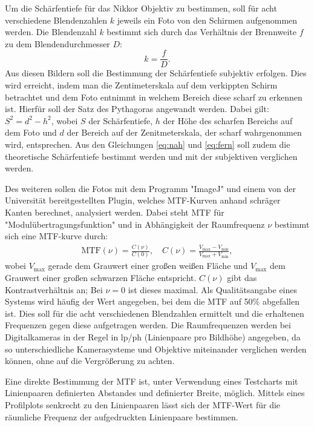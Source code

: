		Um die Schärfentiefe für das Nikkor Objektiv zu bestimmen, soll für acht verschiedene Blendenzahlen $k$ jeweils ein Foto von den Schirmen aufgenommen werden.
		Die Blendenzahl $k$ bestimmt sich durch das Verhältnis der Brennweite $f$ zu dem Blendendurchmesser $D$: 
		\begin{equation}
			k = \frac{f}{D}.
		\end{equation}
		Aus diesen Bildern soll die Bestimmung der Schärfentiefe subjektiv erfolgen.
		Dies wird erreicht, indem man die Zentimeterskala auf dem verkippten Schirm betrachtet und dem Foto entnimmt in welchem Bereich diese scharf zu erkennen ist.
		Hierfür soll der Satz des Pythagoras angewandt werden.
		Dabei gilt: $S^2 = d^2 - h^2$, wobei $S$ der Schärfentiefe, $h$ der Höhe des scharfen Bereichs auf dem Foto und $d$ der Bereich auf der Zenitmeterskala, der scharf wahrgenommen wird, entsprechen.
		Aus den Gleichungen \ref{eq:nah} und \ref{eq:fern} soll zudem die theoretische Schärfentiefe bestimmt werden und mit der subjektiven verglichen werden.
		
		Des weiteren sollen die Fotos mit dem Programm "ImageJ"\cite{ImageJ} und einem von der Universität bereitgestellten Plugin, welches MTF-Kurven anhand schräger Kanten berechnet, analysiert werden.
		Dabei steht MTF für "Modulübertragungsfunktion" und in Abhängigkeit der Raumfrequenz $\nu$ bestimmt sich eine MTF-kurve durch:
		\begin{align}
			\text{MTF}(\nu) = \frac{C(\nu)}{C(0)}, \quad C(\nu) = \frac{V_\text{max}-V_\text{min}}{V_\text{max}+V_\text{min}},
		\end{align}
		wobei $V_\text{max}$ gerade dem Grauwert einer großen weißen Fläche und $V_\text{max}$ dem Grauwert einer großen schwarzen Fläche entspricht.
		$C(\nu)$ gibt das Kontrastverhältnis an; Bei $\nu = 0$ ist dieses maximal.
		Als Qualitätsangabe eines Systems wird häufig der Wert angegeben, bei dem die MTF auf 50\% abgefallen ist.
		Dies soll für die acht verschiedenen Blendzahlen ermittelt und die erhaltenen Frequenzen gegen diese aufgetragen werden.
		Die Raumfrequenzen werden bei Digitalkameras in der Regel in lp/ph (Linienpaare pro Bildhöhe) angegeben, da so unterschiedliche Kamerasysteme und Objektive miteinander verglichen werden können, ohne auf die Vergrößerung zu achten.
		
		Eine direkte Bestimmung der MTF ist, unter Verwendung eines Testcharts mit Linienpaaren definierten Abstandes und definierter Breite, möglich.
		Mittels eines Profilplots senkrecht zu den Linienpaaren lässt sich der MTF-Wert für die räumliche Frequenz der aufgedruckten Linienpaare bestimmen.
		
